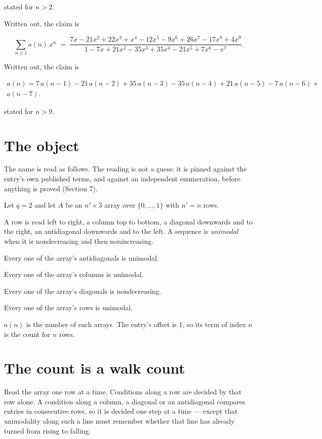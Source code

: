 \documentclass[11pt]{article}
\theoremstyle{definition}
\begin{document}
stated for $n > 2$.

Written out, the claim is

\[\sum_{n \ge 1} a(n)\,x^n \;=\; \frac{7x - 21x^{2} + 22x^{3} + x^{4} - 12x^{5} - 9x^{6} + 26x^{7} - 17x^{8} + 4x^{9}}{1 - 7x + 21x^{2} - 35x^{3} + 35x^{4} - 21x^{5} + 7x^{6} - x^{7}}.\]

Written out, the claim is

\begin{multline*} a(n) = 7\,a(n-1) - 21\,a(n-2) + 35\,a(n-3) - 35\,a(n-4) + 21\,a(n-5) - 7\,a(n-6) + \\ a(n-7). \end{multline*}

stated for $n > 9$.

\section{The object}

The name is read as follows. The reading is not a guess: it is pinned against the entry's own published terms, and against an independent enumeration, before anything is proved (Section 7).

Let $q = 2$ and let $A$ be an $n' \times 3$ array over $\{0,\dots,1\}$ with $n' = n$ rows.

A row is read left to right, a column top to bottom, a diagonal downwards and to the right, an antidiagonal downwards and to the left. A sequence is {\itshape unimodal} when it is nondecreasing and then nonincreasing.

Every one of the array's antidiagonals is unimodal.

Every one of the array's columns is unimodal.

Every one of the array's diagonals is nondecreasing.

Every one of the array's rows is unimodal.

$a(n)$ is the number of such arrays. The entry's offset is 1, so its term of index $n$ is the count for $n$ rows.

\section{The count is a walk count}

Read the array one row at a time. Conditions along a row are decided by that row alone. A condition along a column, a diagonal or an antidiagonal compares entries in consecutive rows, so it is decided one step at a time --- except that unimodality along such a line must remember whether that line has already turned from rising to falling.
\end{document}
